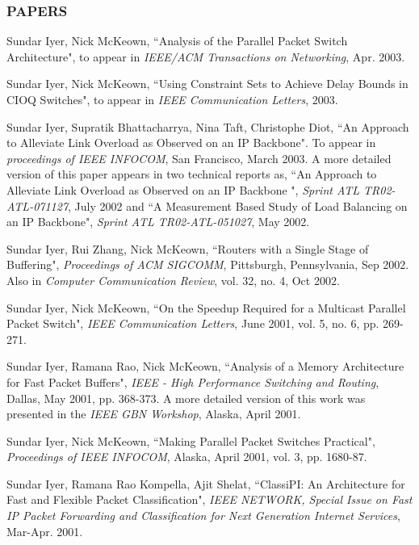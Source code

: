\documentclass[10pt,a4]{article}
\newcounter{myEnumCounter}
\newcounter{mySaveCounter}
\renewenvironment{enumerate}{%
  \begin{list}{\arabic{myEnumCounter}.}{\usecounter{myEnumCounter}%
  \setcounter{myEnumCounter}{\value{mySaveCounter}}}
  }{%
  \setcounter{mySaveCounter}{\value{myEnumCounter}}\end{list}%
}
\begin{document}
\begin{small}
\subsubsection*{PAPERS}

\begin{enumerate}
    \item 
Sundar Iyer, Nick McKeown,
``Analysis of the Parallel Packet Switch Architecture",
to appear in {\it IEEE/ACM Transactions on Networking}, Apr. 2003.

    \item 
Sundar Iyer, Nick McKeown,
``Using Constraint Sets to Achieve Delay Bounds in CIOQ Switches", 
to appear in {\it IEEE Communication Letters}, 2003.

    \item 
Sundar Iyer, Supratik Bhattacharrya, Nina Taft, Christophe Diot,
``An Approach to Alleviate Link Overload as Observed on an IP Backbone". To appear in
{\it proceedings of IEEE INFOCOM}, San Francisco, March 2003. A more detailed
version of this paper appears in two technical reports as, ``An Approach to
Alleviate Link Overload as Observed on an IP Backbone ", {\it Sprint ATL
TR02-ATL-071127}, July 2002 and ``A Measurement Based Study of Load Balancing on an IP Backbone", {\it Sprint ATL TR02-ATL-051027}, May 2002.


    \item 
Sundar Iyer, Rui Zhang, Nick McKeown,
``Routers with a Single Stage of Buffering", 
{\it Proceedings of ACM SIGCOMM}, Pittsburgh, Pennsylvania, Sep 2002. Also in
{\it Computer Communication Review}, vol. 32, no. 4, Oct 2002.


    \item 
Sundar Iyer, Nick McKeown,
``On the Speedup Required for a Multicast Parallel Packet Switch", 
{\it IEEE Communication Letters}, June 2001, vol. 5, no. 6, pp. 269-271.

    \item 
Sundar Iyer, Ramana  Rao, Nick McKeown,
``Analysis of a Memory Architecture for Fast Packet Buffers", 
{\it IEEE - High Performance Switching and Routing}, Dallas, May 2001, pp.
368-373. A more detailed version of this work was presented in the {\it IEEE GBN
Workshop}, Alaska, April 2001.

    \item 
Sundar Iyer, Nick McKeown,
``Making Parallel Packet Switches Practical", 
{\it Proceedings of IEEE INFOCOM}, Alaska, April 2001, vol. 3, pp. 1680-87.


    \item 
Sundar Iyer, Ramana Rao Kompella, Ajit Shelat,
``ClassiPI: An Architecture for Fast and Flexible Packet Classification", 
{\it IEEE NETWORK, Special Issue on Fast IP Packet Forwarding and Classification
for Next Generation Internet Services}, Mar-Apr. 2001. 


\end{enumerate}
\end{small}
\end{document}
